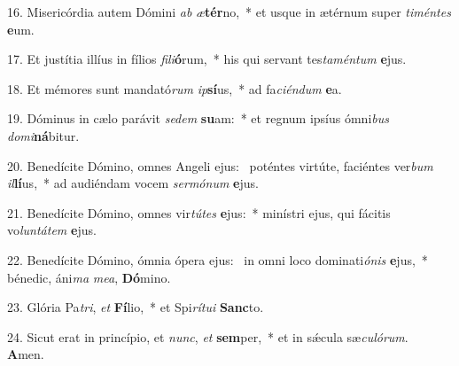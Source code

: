 16. Misericórdia autem Dómini \textit{ab} \textit{æ}\textbf{tér}no,~*  et usque in ætérnum super \textit{ti}\textit{mén}\textit{tes} \textbf{e}um.\

17. Et justítia illíus in fílios \textit{fi}\textit{li}\textbf{ó}rum,~*  his qui servant tes\textit{ta}\textit{mén}\textit{tum} \textbf{e}jus.\

18. Et mémores sunt mandató\textit{rum} \textit{ip}\textbf{sí}us,~*  ad fa\textit{ci}\textit{én}\textit{dum} \textbf{e}a.\

19. Dóminus in cælo parávit \textit{se}\textit{dem} \textbf{su}am:~*  et regnum ipsíus ómni\textit{bus} \textit{do}\textit{mi}\textbf{ná}bitur.\

20. Benedícite Dómino, omnes Angeli ejus: \dag\  poténtes virtúte, faciéntes ver\textit{bum} \textit{il}\textbf{lí}us,~*  ad audiéndam vocem \textit{ser}\textit{mó}\textit{num} \textbf{e}jus.\

21. Benedícite Dómino, omnes vir\textit{tú}\textit{tes} \textbf{e}jus:~*  minístri ejus, qui fácitis vo\textit{lun}\textit{tá}\textit{tem} \textbf{e}jus.\

22. Benedícite Dómino, ómnia ópera ejus: \dag\  in omni loco dominati\textit{ó}\textit{nis} \textbf{e}jus,~*  bénedic, áni\textit{ma} \textit{me}\textit{a}, \textbf{Dó}mino.\

23. Glória Pa\textit{tri}, \textit{et} \textbf{Fí}lio,~*  et Spi\textit{rí}\textit{tu}\textit{i} \textbf{Sanc}to.\

24. Sicut erat in princípio, et \textit{nunc}, \textit{et} \textbf{sem}per,~*  et in sǽcula sæ\textit{cu}\textit{ló}\textit{rum}. \textbf{A}men.\

